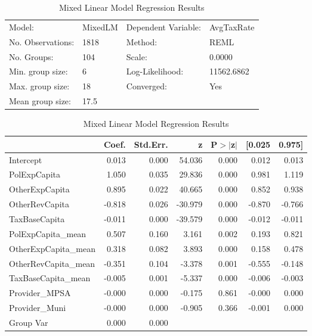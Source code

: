 \begin{table}[H]
\caption{Mixed Linear Model Regression Results}
\label{}
\begin{center}
\begin{tabular}{llll}
\hline
Model:            & MixedLM & Dependent Variable: & AvgTaxRate  \\
No. Observations: & 1818    & Method:             & REML        \\
No. Groups:       & 104     & Scale:              & 0.0000      \\
Min. group size:  & 6       & Log-Likelihood:     & 11562.6862  \\
Max. group size:  & 18      & Converged:          & Yes         \\
Mean group size:  & 17.5    &                     &             \\
\hline
\end{tabular}
\end{center}

\begin{center}
\begin{tabular}{lrrrrrr}
\hline
                     &  Coef. & Std.Err. &       z & P$> |$z$|$ & [0.025 & 0.975]  \\
\hline
Intercept            &  0.013 &    0.000 &  54.036 &       0.000 &  0.012 &  0.013  \\
PolExpCapita         &  1.050 &    0.035 &  29.836 &       0.000 &  0.981 &  1.119  \\
OtherExpCapita       &  0.895 &    0.022 &  40.665 &       0.000 &  0.852 &  0.938  \\
OtherRevCapita       & -0.818 &    0.026 & -30.979 &       0.000 & -0.870 & -0.766  \\
TaxBaseCapita        & -0.011 &    0.000 & -39.579 &       0.000 & -0.012 & -0.011  \\
PolExpCapita\_mean   &  0.507 &    0.160 &   3.161 &       0.002 &  0.193 &  0.821  \\
OtherExpCapita\_mean &  0.318 &    0.082 &   3.893 &       0.000 &  0.158 &  0.478  \\
OtherRevCapita\_mean & -0.351 &    0.104 &  -3.378 &       0.001 & -0.555 & -0.148  \\
TaxBaseCapita\_mean  & -0.005 &    0.001 &  -5.337 &       0.000 & -0.006 & -0.003  \\
Provider\_MPSA       & -0.000 &    0.000 &  -0.175 &       0.861 & -0.000 &  0.000  \\
Provider\_Muni       & -0.000 &    0.000 &  -0.905 &       0.366 & -0.001 &  0.000  \\
Group Var            &  0.000 &    0.000 &         &             &        &         \\
\hline
\end{tabular}
\end{center}
\end{table}
\bigskip
